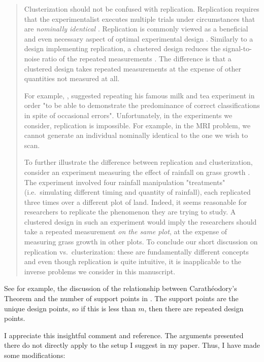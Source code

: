 \begin{quote}
  Clusterization should not be confused with replication. Replication
  requires that the experimentalist executes multiple trials under
  circumstances that are \emph{nominally identical} \cite[Section
    1.2.4]{morris2011}. Replication is commonly viewed as a beneficial
  and even necessary aspect of optimal experimental design
  \cite{fisher1949design, morris2011,
    schafer2001replication}. Similarly to a design implementing
  replication, a clustered design reduces the signal-to-noise ratio of
  the repeated measurements \cite{telford2007brief}. The difference is
  that a clustered design takes repeated measurements at the expense
  of other quantities not measured at all.

  For example, \cite{fisher1949design}, suggested repeating his famous
  milk and tea experiment in order "to be able to demonstrate the
  predominance of correct classifications in spite of occasional
  errors". Unfortunately, in the experiments we consider, replication
  is impossible. For example, in the MRI problem, we cannot generate
  an individual nominally identical to the one we wish to scan.

  To further illustrate the difference between replication and
  clusterization, consider an experiment measuring the effect of
  rainfall on grass growth \cite{fay2000rainfall}. The experiment
  involved four rainfall manipulation "treatments" (i.e.~simulating
  different timing and quantity of rainfall), each replicated three
  times over a different plot of land. Indeed, it seems reasonable for
  researchers to replicate the phenomenon they are trying to study. A
  clustered design in such an experiment would imply the researchers
  should take a repeated measurement \emph{on the same plot}, at the
  expense of measuring grass growth in other plots. To conclude our
  short discussion on replication vs.~clusterization: these are
  fundamentally different concepts and even though replication is
  quite intuitive, it is inapplicable to the inverse problems we
  consider in this manuscript.
\end{quote}


\RC See for example, the discussion of the relationship between
Carath\'eodory’s Theorem and the number of support points in \cite[page
  139]{pronzatoPazman2013}. The support points are the unique design
points, so if this is less than $m$, then there are repeated design
points.
  
\AR I appreciate this insightful comment and reference. The arguments
presented there do not directly apply to the setup I suggest in my
paper. Thus, I have made some modifications:

